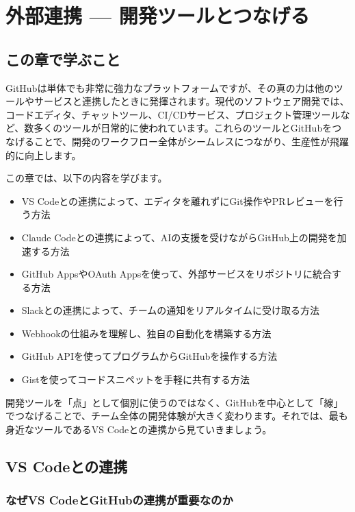 \chapter{外部連携 --- 開発ツールとつなげる}

\section{この章で学ぶこと}

GitHubは単体でも非常に強力なプラットフォームですが、その真の力は他のツールやサービスと連携したときに発揮されます。現代のソフトウェア開発では、コードエディタ、チャットツール、CI/CDサービス、プロジェクト管理ツールなど、数多くのツールが日常的に使われています。これらのツールとGitHubをつなげることで、開発のワークフロー全体がシームレスにつながり、生産性が飛躍的に向上します。

この章では、以下の内容を学びます。

\begin{itemize}
  \item VS Codeとの連携によって、エディタを離れずにGit操作やPRレビューを行う方法
  \item Claude Codeとの連携によって、AIの支援を受けながらGitHub上の開発を加速する方法
  \item GitHub AppsやOAuth Appsを使って、外部サービスをリポジトリに統合する方法
  \item Slackとの連携によって、チームの通知をリアルタイムに受け取る方法
  \item Webhookの仕組みを理解し、独自の自動化を構築する方法
  \item GitHub APIを使ってプログラムからGitHubを操作する方法
  \item Gistを使ってコードスニペットを手軽に共有する方法
\end{itemize}

開発ツールを「点」として個別に使うのではなく、GitHubを中心として「線」でつなげることで、チーム全体の開発体験が大きく変わります。それでは、最も身近なツールであるVS Codeとの連携から見ていきましょう。

\section{VS Codeとの連携}

\subsection{なぜVS CodeとGitHubの連携が重要なのか}


